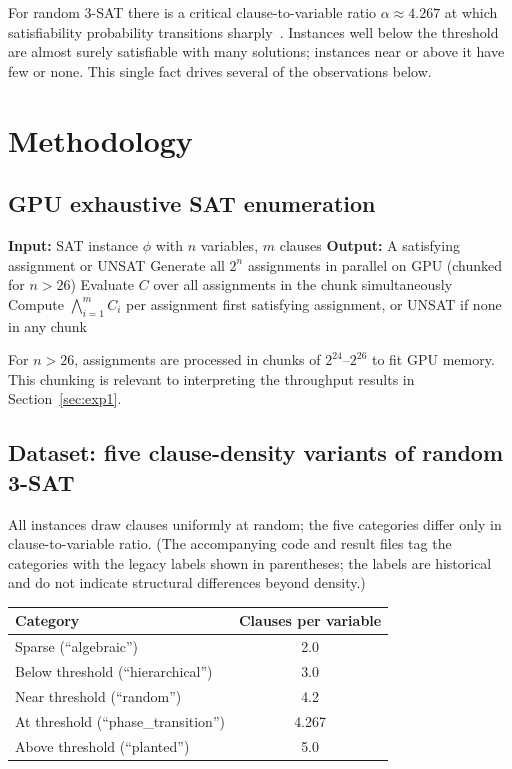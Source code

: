 \documentclass[11pt]{article}
\newcommand{\SAT}{\textsf{SAT}}
\begin{document}
For random 3-\SAT{} there is a critical clause-to-variable ratio $\alpha \approx 4.267$ at which satisfiability probability transitions sharply~\cite{MezardZecchina2002}. Instances well below the threshold are almost surely satisfiable with many solutions; instances near or above it have few or none. This single fact drives several of the observations below.

\section{Methodology}
\label{sec:method}

\subsection{GPU exhaustive SAT enumeration}

\begin{algorithm}
\caption{GPU Exhaustive SAT Enumeration}
\begin{algorithmic}[1]
\STATE \textbf{Input:} SAT instance $\phi$ with $n$ variables, $m$ clauses
\STATE \textbf{Output:} A satisfying assignment or UNSAT
\STATE Generate all $2^n$ assignments in parallel on GPU (chunked for $n > 26$)
    \STATE Evaluate $C$ over all assignments in the chunk simultaneously
\ENDFOR
\STATE Compute $\bigwedge_{i=1}^m C_i$ per assignment
\RETURN first satisfying assignment, or UNSAT if none in any chunk
\end{algorithmic}
\end{algorithm}

For $n > 26$, assignments are processed in chunks of $2^{24}$--$2^{26}$ to fit GPU memory. This chunking is relevant to interpreting the throughput results in Section~\ref{sec:exp1}.

\subsection{Dataset: five clause-density variants of random 3-SAT}
\label{sec:dataset}

All instances draw clauses uniformly at random; the five categories differ only in clause-to-variable ratio. (The accompanying code and result files tag the categories with the legacy labels shown in parentheses; the labels are historical and do not indicate structural differences beyond density.)

\begin{center}
\begin{tabular}{lc}
\toprule
Category & Clauses per variable \\
\midrule
Sparse (``algebraic'') & 2.0 \\
Below threshold (``hierarchical'') & 3.0 \\
Near threshold (``random'') & 4.2 \\
At threshold (``phase\_transition'') & 4.267 \\
Above threshold (``planted'') & 5.0 \\
\bottomrule
\end{tabular}
\end{center}
\end{document}
